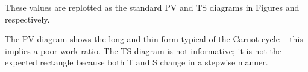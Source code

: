 These values are replotted as the standard PV and TS diagrams in
Figures
and
respectively.

The PV diagram shows the long and thin form typical of the Carnot
cycle -- this implies a poor work ratio. The TS diagram is not
informative; it is not the expected rectangle because both T and S
change in a stepwise manner.




